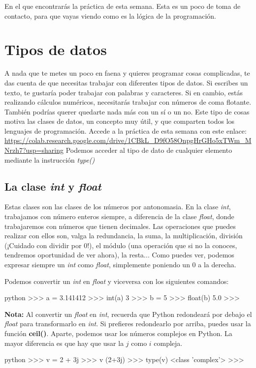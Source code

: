 \documentclass{article}
\begin{document}
En el que encontrarás la práctica de esta semana. Esta es un poco de toma de contacto, para que vayas viendo como es la lógica de la programación.

\section{Tipos de datos}

A nada que te metes un poco en faena y quieres programar cosas complicadas, te das cuenta de que necesitas trabajar con diferentes tipos de datos. Si escribes un texto, te gustaría poder trabajar con palabras y caracteres. Si en cambio, estás realizando cálculos numéricos, necesitarás trabajar con números de coma flotante. También podrías querer quedarte nada más con un sí o un no. Este tipo de cosas motiva las clases de datos, un concepto muy útil, y que comparten todos los lenguajes de programación.
Accede a la práctica de esta semana con este enlace: \url{https://colab.research.google.com/drive/1CBkL_D9fO58OnpgHrGHo5xTWm_MNrzh7?usp=sharing}
Podemos acceder al tipo de dato de cualquier elemento mediante la instrucción \textit{type()}
\subsection{La clase \textit{int} y \textit{float}}
Estas clases son las clases de los números por antonomasia. En la clase \textit{int}, trabajamos con número enteros siempre, a diferencia de la clase \textit{float}, donde trabajaremos con números que tienen decimales. Las operaciones que puedes realizar con ellos son, valga la redundancia, la suma, la multiplicación, división (¡Cuidado con dividir por 0!), el módulo (una operación que si no la conoces, tendremos oportunidad de ver ahora), la resta... Como puedes ver, podemos expresar siempre un \textit{int} como \textit{float}, simplemente poniendo un 0 a la derecha.

Podemos convertir un \textit{int} en \textit{float} y viceversa con los siguientes comandos:
\begin{mintedbox}{python}
>>> a = 3.141412
>>> int(a)
3
>>> b = 5
>>> float(b)
5.0
>>> 
\end{mintedbox}
\textbf{Nota: } Al convertir un \textit{float} en \textit{int}, recuerda que Python redondeará por debajo el \textit{float} para transformarlo en \textit{int}. Si prefieres redondearlo por arriba, puedes usar la función \textbf{ceil()}.
Aparte, podemos usar los números complejos en Python. La mayor diferencia es que hay que usar la $j$ como $i$ compleja.
\begin{mintedbox}{python}
>>> v = 2 + 3j
>>> v
(2+3j)
>>> type(v)
<class 'complex'>
>>> 
\end{mintedbox}
\end{document}
